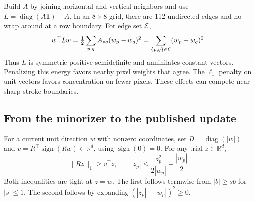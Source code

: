Build $A$ by joining horizontal and vertical neighbors and use $L=\operatorname{diag}(A\mathbf1)-A$. In an $8\times8$ grid, there are 112 undirected edges and no wrap around at a row boundary. For edge set $\mathcal{E}$,
\begin{equation}
 w^\top Lw=\tfrac{1}{2}\sum_{p,q}A_{pq}(w_p-w_q)^2
           =\sum_{\{p,q\}\in\mathcal{E}}(w_p-w_q)^2 .
 \label{eq:energy}
\end{equation}
Thus $L$ is symmetric positive semidefinite and annihilates constant vectors. Penalizing this energy favors nearby pixel weights that agree. The $\ell_1$ penalty on unit vectors favors concentration on fewer pixels. These effects can compete near sharp stroke boundaries.


\clearpage
\subsection{From the minorizer to the published update}

For a current unit direction $w$ with nonzero coordinates, set $D=\operatorname{diag}(|w|)$ and $v=R^\top\operatorname{sign}(Rw)\in\mathbb R^d$, using $\operatorname{sign}(0)=0$. For any trial $z\in\mathbb R^d$,
\[
 \|Rz\|_1\ge v^\top z,\qquad
 |z_p|\le\frac{z_p^2}{2|w_p|}+\frac{|w_p|}{2}.
\]
Both inequalities are tight at $z=w$. The first follows termwise from $|b|\ge s b$ for $|s|\le1$. The second follows by expanding $(|z_p|-|w_p|)^2\ge0$.

